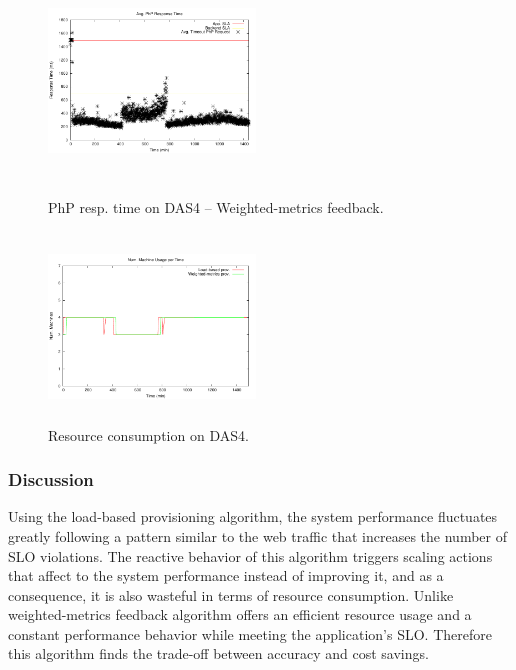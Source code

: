 \begin{figure}
\begin{center}
\includegraphics[width=0.49\textwidth, height=6cm]{./images/homogeneous/avgTimeout_PhP_history}
\end{center}
\caption{PhP resp. time on DAS4 -- Weighted-metrics feedback.}
\label{historyDas4}
\end{figure}

\begin{figure}
\begin{center}
\includegraphics[width=0.49\textwidth, height=5cm]{./images/homogeneous/numMachinesComp}
\end{center}
\caption{Resource consumption on DAS4.}
\label{resComDas4}
\end{figure}

\subsubsection{Discussion}

Using the load-based provisioning algorithm, the system performance fluctuates greatly following a pattern similar to the web traffic that increases the number of SLO violations. The reactive behavior of this algorithm triggers scaling actions that affect to the system performance instead of improving it, and as a consequence, it is also wasteful in terms of resource consumption. Unlike weighted-metrics feedback algorithm offers an efficient resource usage and a constant performance behavior while meeting the application's SLO. Therefore this algorithm finds the trade-off between accuracy and cost savings.

